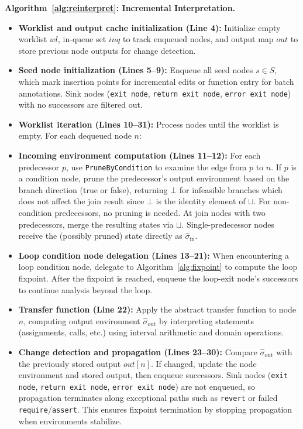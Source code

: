 \documentclass[pdflatex,sn-basic]{sn-jnl}%
\theoremstyle{thmstyleone}%
\theoremstyle{thmstyletwo}%
\theoremstyle{thmstylethree}%
\begin{document}
\noindent\textbf{Algorithm~\ref{alg:reinterpret}: Incremental Interpretation.}
\begin{itemize}
  \item \textbf{Worklist and output cache initialization (Line 4):} Initialize empty worklist $wl$, in-queue set $inq$ to track enqueued nodes, and output map $out$ to store previous node outputs for change detection.

  \item \textbf{Seed node initialization (Lines 5--9):} Enqueue all seed nodes $s \in S$, which mark insertion points for incremental edits or function entry for batch annotations. Sink nodes (\texttt{exit node}, \texttt{return exit node}, \texttt{error exit node}) with no successors are filtered out.

  \item \textbf{Worklist iteration (Lines 10--31):} Process nodes until the worklist is empty. For each dequeued node $n$:

  \item \textbf{Incoming environment computation (Lines 11--12):} For each predecessor $p$, use \texttt{PruneByCondition} to examine the edge from $p$ to $n$. If $p$ is a condition node, prune the predecessor's output environment based on the branch direction (true or false), returning $\bot$ for infeasible branches which does not affect the join result since $\bot$ is the identity element of $\sqcup$. For non-condition predecessors, no pruning is needed. At join nodes with two predecessors, merge the resulting states via $\sqcup$. Single-predecessor nodes receive the (possibly pruned) state directly as $\hat{\sigma}_{\mathrm{in}}$.

  \item \textbf{Loop condition node delegation (Lines 13--21):} When encountering a loop condition node, delegate to Algorithm~\ref{alg:fixpoint} to compute the loop fixpoint. After the fixpoint is reached, enqueue the loop-exit node's successors to continue analysis beyond the loop.

  \item \textbf{Transfer function (Line 22):} Apply the abstract transfer function to node $n$, computing output environment $\hat{\sigma}_{\mathrm{out}}$ by interpreting statements (assignments, calls, etc.) using interval arithmetic and domain operations.

  \item \textbf{Change detection and propagation (Lines 23--30):} Compare $\hat{\sigma}_{\mathrm{out}}$ with the previously stored output $out[n]$. If changed, update the node environment and stored output, then enqueue successors. Sink nodes (\texttt{exit node}, \texttt{return exit node}, \texttt{error exit node}) are not enqueued, so propagation terminates along exceptional paths such as \texttt{revert} or failed \texttt{require}/\texttt{assert}. This ensures fixpoint termination by stopping propagation when environments stabilize.
\end{itemize}
\end{document}
